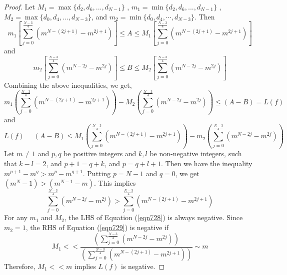 \documentclass[a4paper,leqno,12pt]{amsart}
\theoremstyle{plain}
\theoremstyle{definition}
\theoremstyle{remark}
\begin{document}
{\begin{proof}
\noindent
Let $ M_{1} = \max \{ d_{2}, d_{6}, ... , d_{N-1}\} $ ,   $ m_{1} =\min \{ d_{2}, d_{6},...,d_{N-1}\} $ ,  $ M_{2} = \max \{ d_{0}, d_{4}, ... , d_{N-3}\} $,  and $ m_{2} = \min \{ d_{0}, d_{4},  \cdots,  d_{N-3}\} $. 
Then  
\begin{equation}
  m_{1} \left [\sum_{j=0}^{\frac{N-3}{4}} ( m^{N-(2j+1)}-m^{2j+1}) \right ] \leq A \leq M_{1} \left [\sum_{j=0}^{\frac{N-3}{4}} ( m^{N-(2j+1)}-m^{2j+1}) \right ] \nonumber
\end{equation}
and 
\begin{equation}
  m_{2} \left [ \sum_{j=0}^{\frac{N-3}{4}} ( m^{N-2j}-m^{2j}) \right ] \leq B \leq M_{2} \left [ \sum_{j=0}^{\frac{N-3}{4}} ( m^{N-2j}-m^{2j})\right ] \nonumber
\end{equation}
\noindent
Combining the above inequalities,  we get, 
\begin{equation}
    m_{1} \left ( \sum_{j=0}^{\frac{N-3}{4}} ( m^{N-(2j+1)}-m^{2j+1}) \right )-  M_{2} \left ( \sum_{j=0}^{\frac{N-3}{4}} ( m^{N-2j}-m^{2j}) \right ) \leq (A-B) = L(f) \label{eqn728}
\end{equation}
and 
\begin{equation}
   L(f)=(A-B)
   \leq M_{1} \left ( \sum_{j=0}^{\frac{N-3}{4}} ( m^{N-(2j+1)}-m^{2j+1}) \right ) - m_{2} \left ( \sum_{j=0}^{\frac{N-3}{4}} ( m^{N-2j}-m^{2j}) \right )  \label{eqn729}
\end{equation}
 \noindent
 Let $m \neq 1$ and $p, q$  be positive integers and $k,l$ be non-negative integers,  such that $k-l=2$,  and $p+1 = q+k$,   and $p = q+l+1$.  Then we have the inequality $ m^{p+1}-m^{q} > m^{p}-m^{q+1}$.  Putting $p = N-1$ and $q=0$,  we get $(m^{N}-1) > (m^{N-1}-m)$.  This implies 
\begin{equation}
  \sum_{j=0}^{\frac{N-3}{4}} ( m^{N-2j}-m^{2j}) > \sum_{j=0}^{\frac{N-3}{4}} ( m^{N-(2j+1)}-m^{2j+1})  
\end{equation}
\noindent
For any $m_{1}$ and $M_{2}$,  the LHS of Equation (\ref{eqn728}) is always negative.  Since $m_{2} =1$,  the RHS of Equation (\ref{eqn729}) is negative if 
\begin{equation}
    M_{1}<< \frac{ \left (\sum_{j=0}^{\frac{N-3}{4}} ( m^{N-2j}-m^{2j}) \right )}{\left ( \sum_{j=0}^{\frac{N-3}{4}} ( m^{N-(2j+1)}-m^{2j+1}) \right )} \sim m \nonumber
\end{equation}
\noindent
Therefore,  $M_{1} << m $ implies $L(f)$ is negative.  
\end{proof}

\vspace{0.5cm}


}
\end{document}
